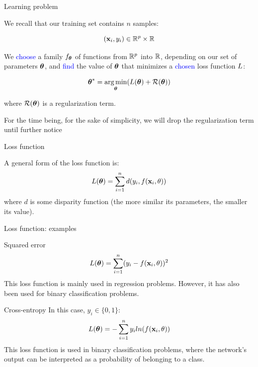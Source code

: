 \documentclass[xcolor=pdftex,dvipsnames,table,mathserif]{beamer}
\begin{document}
\begin{frame}{Learning problem}

  We recall that our training set contains $n$ samples:

  \[
  (\mathbf{x}_i, y_i) \in \mathbb{R}^p \times \mathbb{R}
  \]

  We \textcolor{blue}{choose} a family $f_{\boldsymbol{\theta}}$
  of functions from $\mathbb{R}^p$ into $\mathbb{R}$,
  depending on our set of parameters $\boldsymbol{\theta}$,
  and \textcolor{blue}{find} the value of $\boldsymbol{\theta}$
  that minimizes a \textcolor{blue}{chosen} loss function $L$:

\[
\boldsymbol{\theta} ^{\ast} = \operatorname*{arg\,min}_{\boldsymbol{\theta}} ( L (\boldsymbol{\theta}) + \mathcal{R}(\boldsymbol{\theta}) )
\]

where $\mathcal{R}(\boldsymbol{\theta})$ is a regularization term.

\vspace{1em}

\small{For the time being, for the sake of simplicity, we will drop the regularization term until further notice}

\end{frame}

\begin{frame}{Loss function}

  A general form of the loss function is:
  \[
  L(\boldsymbol{\theta}) = \sum\limits_{i=1}^n d(y_i, f(\mathbf{x}_i, \theta))
  \]
  where $d$ is some disparity function (the more similar its parameters, the smaller its value).

\end{frame}


\begin{frame}{Loss function: examples}


  \begin{block}{Squared error}
    \[
    L(\boldsymbol{\theta}) = \sum\limits_{i=1}^n (y_i - f(\mathbf{x}_i, \theta))^2
    \]
    This loss function is mainly used in regression problems. However, it has also been used for binary classification problems.
  \end{block}

  \begin{block}{Cross-entropy}
    In this case, $y_i \in \{0, 1\}$:
    \[
    L(\boldsymbol{\theta}) = -\sum\limits_{i=1}^n y_i ln( f(\mathbf{x}_i, \theta) )
    \]
    This loss function is used in binary classification problems, where the network's output can be interpreted as a probability of belonging to a class.
  \end{block}

\end{frame}
\end{document}
